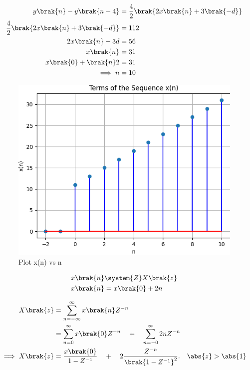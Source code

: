 \documentclass[journal,12pt,twocolumn]{IEEEtran}
\theoremstyle{remark}
\begin{document}
\begin{align}
y\brak{n}-y\brak{n-4}&=\frac{4}{2}\brak{2x\brak{n}+3\brak{-d}}\\
\frac{4}{2}\brak{2x\brak{n}+3\brak{-d}}&=112\\
2x\brak{n}-3d&=56\\
x\brak{n}&=31\\
x\brak{0}+\brak{n}2&=31\\
\implies n&=10
\end{align}
\newpage
\begin{figure}
    \includegraphics[width=\columnwidth]{figs/fig.png}
    \centering
    Plot x(n) vs n
    \label{fig:enter-label}
\end{figure}

\begin{align}
	x \brak{n} &\system{Z} X \brak{z}\\
	x\brak{n}&=x\brak{0}+2n
\end{align}

\begin{align}
X\brak{z}&= \sum_{n=-\infty}^{\infty} x\brak{n}Z^{-n} \\
&=\sum_{n=0}^{\infty} x\brak{0}Z^{-n}\quad +\quad \sum_{n=-0}^{\infty}2nZ^{-n}\\
\implies X\brak{z}&=\frac{x\brak{0}}{1-Z^{-1}}\quad+\quad 2\frac{Z^{-n}}{\brak{1-Z^{-1}}^{2}}.\quad \abs{z} > \abs{1}
\end{align}
\end{document}
